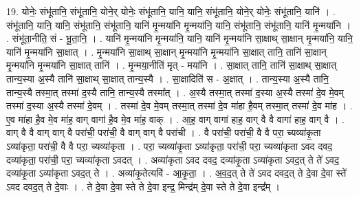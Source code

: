 \documentclass[17pt]{extarticle}
\begin{document}
19. योनेः॒ संभू॑तानि॒ संभू॑तानि॒ योने॒र् योनेः॒ संभू॑तानि॒ यानि॒ यानि॒ संभू॑तानि॒ योने॒र् योनेः॒ संभू॑तानि॒ यानि॑ । . संभू॑तानि॒ यानि॒ यानि॒ संभू॑तानि॒ संभू॑तानि॒ यानि॑ मृ॒न्मया॑नि मृ॒न्मया॑नि॒ यानि॒ संभू॑तानि॒ संभू॑तानि॒ यानि॑ मृ॒न्मया॑नि । . संभू॑ता॒नीति॒ सं - भू॒ता॒नि॒ । . यानि॑ मृ॒न्मया॑नि मृ॒न्मया॑नि॒ यानि॒ यानि॑ मृ॒न्मया॑नि सा॒क्षाथ् सा॒क्षान् मृ॒न्मया॑नि॒ यानि॒ यानि॑ मृ॒न्मया॑नि सा॒क्षात् । . मृ॒न्मया॑नि सा॒क्षाथ् सा॒क्षान् मृ॒न्मया॑नि मृ॒न्मया॑नि सा॒क्षात् तानि॒ तानि॑ सा॒क्षान् मृ॒न्मया॑नि मृ॒न्मया॑नि सा॒क्षात् तानि॑ । . मृ॒न्मया॒नीति॑ मृत् - मया॑नि । . सा॒क्षात् तानि॒ तानि॑ सा॒क्षाथ् सा॒क्षात् तान्य॒स्या अ॒स्यै तानि॑ सा॒क्षाथ् सा॒क्षात् तान्य॒स्यै । . सा॒क्षादिति॑ स - अ॒क्षात् । . तान्य॒स्या अ॒स्यै तानि॒ तान्य॒स्यै तस्मा॒त् तस्मा॑ द॒स्यै तानि॒ तान्य॒स्यै तस्मा᳚त् । . अ॒स्यै तस्मा॒त् तस्मा॑ द॒स्या अ॒स्यै तस्मा॑ दे॒व मे॒वम् तस्मा॑ द॒स्या अ॒स्यै तस्मा॑ दे॒वम् । . तस्मा॑ दे॒व मे॒वम् तस्मा॒त् तस्मा॑ दे॒व मा॑हा है॒वम् तस्मा॒त् तस्मा॑ दे॒व मा॑ह । . ए॒व मा॑हा है॒व मे॒व मा॑ह॒ वाग् वागा॑ है॒व मे॒व मा॑ह॒ वाक् । . आ॒ह॒ वाग् वागा॑ हाह॒ वाग् वै वै वागा॑ हाह॒ वाग् वै । . वाग् वै वै वाग् वाग् वै परा॑ची॒ परा॑ची॒ वै वाग् वाग् वै परा॑ची । . वै परा॑ची॒ परा॑ची॒ वै वै परा॒ च्यव्या॑कृ॒ता ऽव्या॑कृता॒ परा॑ची॒ वै वै परा॒ च्यव्या॑कृता । . परा॒ च्यव्या॑कृ॒ता ऽव्या॑कृता॒ परा॑ची॒ परा॒ च्यव्या॑कृता ऽवद दवद॒ दव्या॑कृता॒ परा॑ची॒ परा॒
च्यव्या॑कृता ऽवदत् । . अव्या॑कृता ऽवद दवद॒ दव्या॑कृ॒ता ऽव्या॑कृता ऽवद॒त् ते ते॑ ऽवद॒ दव्या॑कृ॒ता ऽव्या॑कृता ऽवद॒त् ते । . अव्या॑कृ॒तेत्यवि॑ - आ॒कृ॒ता॒ । . अ॒व॒द॒त् ते ते॑ ऽवद दवद॒त् ते दे॒वा दे॒वा स्ते॑ ऽवद दवद॒त् ते दे॒वाः । . ते दे॒वा दे॒वा स्ते ते दे॒वा इन्द्र॒ मिन्द्र॑म् दे॒वा स्ते ते दे॒वा इन्द्र᳚म् । \newline
\end{document}

